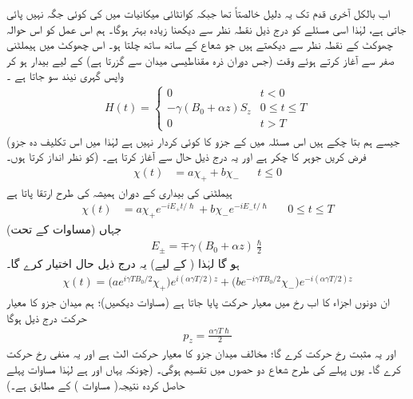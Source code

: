  اب بالکل آخری قدم تک یہ دلیل خالصتاً    تھا جبکہ کوانٹائی میکانیات میں  کی کوئی جگہ نہیں پائی جاتی ہے، لہٰذا اسی مسئلے کو درج ذیل نقطہ نظر سے دیکھنا زیادہ بہتر ہوگا۔  ہم اس عمل کو اس حوالہ چھوکٹ کے نقطہ نظر سے دیکھتے ہیں جو شعاع کے ساتھ ساتھ چلتا ہو۔ اس چھوکٹ میں ہیملٹنی صفر سے آغاز  کرتے ہوئے وقت  (جس دوران ذرہ مقناطیسی میدان سے گزرتا ہے)  کے لیے بیدار ہو کر واپس گہری نیند سو جاتا ہے ۔
\begin{align}
H (t) = 
\begin{cases}
0 & t < 0 \\
- \gamma (B_0 + \alpha z) S_z & 0 \le t \le T \\
0 & t > T
\end{cases}
\end{align}
(جیسے ہم بتا چکے ہیں اس مسئلہ میں  کے  جزو کا کوئی کردار نہیں ہے لہٰذا میں اس تکلیف دہ جزو کو نظر انداز کرتا ہوں۔) فرض کریں جوہر کا چکر  ہے اور یہ درج ذیل حال سے آغاز  کرتا ہے۔ 
\begin{align*}
\chi (t) &= a \chi_{+} + b\chi_{-} && t\le 0
\end{align*}
ہیملٹنی کی بیداری کے دوران   ہمیشہ کی طرح ارتقا پاتا ہے 
\begin{align*}
\chi (t) &= a \chi_{+} e^{- i E_{+} t/\hslash} + b \chi_{-} e^{- i E_{-} t/\hslash} && 0 \le  t \le T
\end{align*}
جہاں (مساوات   کے تحت) 
\begin{align}
E_{\pm} = \mp \gamma (B_0 + \alpha z) \frac{\hslash}{2}
\end{align} 
 ہو گا لہٰذا (  کے لیے)  یہ درج ذیل حال اختیار کرے گا۔ 
\begin{align}
\chi (t) = \big ( a e^{i \gamma T B_0 /2} \chi_{+} \big ) e^{i (\alpha \gamma T/2) z} + \big ( b e^{- i \gamma T B_0 /2} \chi_{-} \big ) e^{- i (\alpha \gamma T/2) z}
\end{align}
ان دونوں اجزاء کا اب  رخ میں   معیار حرکت پایا جاتا ہے (مساوات  دیکھیں)؛   ہم  میدان جزو کا معیار حرکت درج ذیل ہوگا 
\begin{align}\label{مساوات_تین_ابعادی_کوانٹائی_زیڈ_معیار_حرکت}
p_z = \frac{\alpha \gamma T \hslash}{2}
\end{align}
اور یہ مثبت  رخ  حرکت  کرے گا؛  مخالف میدان جزو کا معیار حرکت الٹ ہے اور یہ منفی  رخ  حرکت کرے گا۔ یوں پہلے کی طرح شعاع دو حصوں میں تقسیم ہوگی۔  (چونکہ 
یہاں  اور   ہے لہٰذا مساوات   پہلے حاصل کردہ  نتیجہ( مساوات  )   کے مطابق ہے۔)

